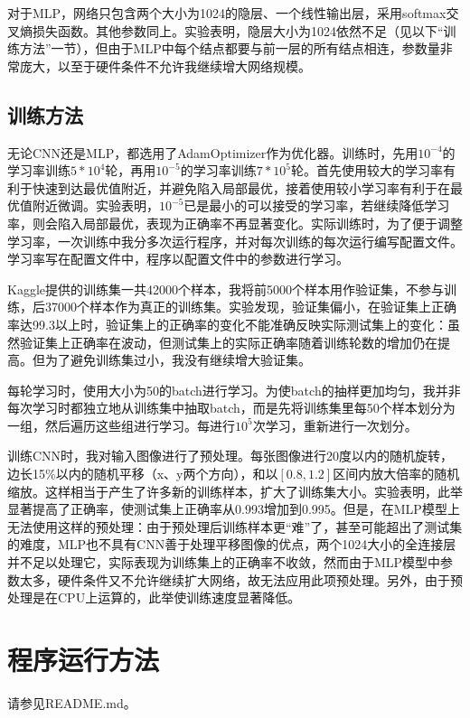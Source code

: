 \documentclass[UTF8]{ctexart}
\begin{document}
            对于MLP，网络只包含两个大小为1024的隐层、一个线性输出层，采用softmax交叉熵损失函数。其他参数同上。实验表明，隐层大小为1024依然不足（见以下“训练方法”一节），但由于MLP中每个结点都要与前一层的所有结点相连，参数量非常庞大，以至于硬件条件不允许我继续增大网络规模。

        \subsection{训练方法}
            无论CNN还是MLP，都选用了AdamOptimizer作为优化器。训练时，先用$10^{-4}$的学习率训练$5*10^4$轮，再用$10^{-5}$的学习率训练$7*10^5$轮。首先使用较大的学习率有利于快速到达最优值附近，并避免陷入局部最优，接着使用较小学习率有利于在最优值附近微调。实验表明，$10^{-5}$已是最小的可以接受的学习率，若继续降低学习率，则会陷入局部最优，表现为正确率不再显著变化。实际训练时，为了便于调整学习率，一次训练中我分多次运行程序，并对每次训练的每次运行编写配置文件。学习率写在配置文件中，程序以配置文件中的参数进行学习。

            Kaggle提供的训练集一共42000个样本，我将前5000个样本用作验证集，不参与训练，后37000个样本作为真正的训练集。实验发现，验证集偏小，在验证集上正确率达99.3以上时，验证集上的正确率的变化不能准确反映实际测试集上的变化：虽然验证集上正确率在波动，但测试集上的实际正确率随着训练轮数的增加仍在提高。但为了避免训练集过小，我没有继续增大验证集。

            每轮学习时，使用大小为50的batch进行学习。为使batch的抽样更加均匀，我并非每次学习时都独立地从训练集中抽取batch，而是先将训练集里每50个样本划分为一组，然后遍历这些组进行学习。每进行$10^5$次学习，重新进行一次划分。

            训练CNN时，我对输入图像进行了预处理。每张图像进行20度以内的随机旋转，边长15\%以内的随机平移（x、y两个方向），和以$[0.8,1.2]$区间内放大倍率的随机缩放。这样相当于产生了许多新的训练样本，扩大了训练集大小。实验表明，此举显著提高了正确率，使测试集上正确率从0.993增加到0.995。但是，在MLP模型上无法使用这样的预处理：由于预处理后训练样本更“难”了，甚至可能超出了测试集的难度，MLP也不具有CNN善于处理平移图像的优点，两个1024大小的全连接层并不足以处理它，实际表现为训练集上的正确率不收敛，然而由于MLP模型中参数太多，硬件条件又不允许继续扩大网络，故无法应用此项预处理。另外，由于预处理是在CPU上运算的，此举使训练速度显著降低。

    \section{程序运行方法}

        请参见README.md。
\end{document}

